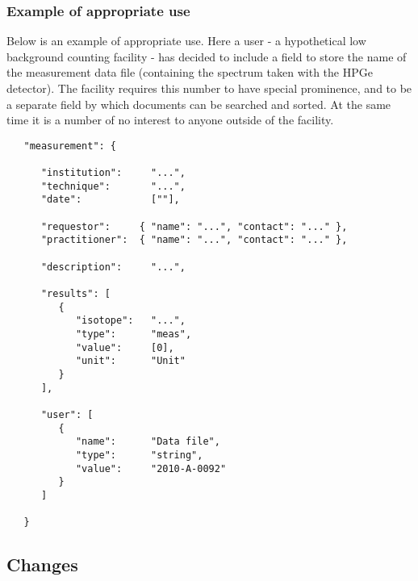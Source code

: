 \documentclass[11pt, letterpaper]{article}
\begin{document}
\newpage

\subsubsection{Example of appropriate use}

\noindent Below is an example of appropriate use. Here a user - a hypothetical low background counting facility - has decided to include a field to store the name of the measurement data file (containing the spectrum taken with the HPGe detector). The facility requires this number to have special prominence, and to be a separate field by which documents can be searched and sorted. At the same time it is a number of no interest to anyone outside of the facility.

\begin{small}
\begin{verbatim}
   "measurement": {
    
      "institution":     "...",
      "technique":       "...",
      "date":            [""],
      
      "requestor":     { "name": "...", "contact": "..." },
      "practitioner":  { "name": "...", "contact": "..." },
               
      "description":     "...",

      "results": [
         {
            "isotope":   "...",
            "type":      "meas",
            "value":     [0],
            "unit":      "Unit"
         }
      ],

      "user": [
         { 
            "name":      "Data file", 
            "type":      "string",
            "value":     "2010-A-0092" 
         }
      ]
      
   }
\end{verbatim}
\end{small}

\newpage

\subsection{Changes} %
\end{document}
